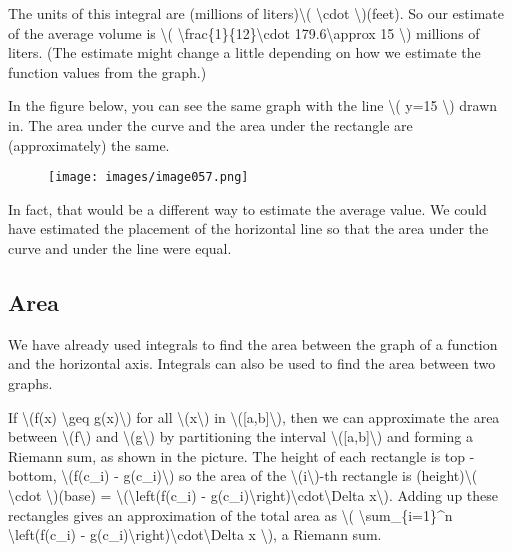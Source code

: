 The units of this integral are (millions of liters)\textbackslash{}(
\textbackslash{}cdot \textbackslash{})(feet). So our estimate of the
average volume is \textbackslash{}(
\textbackslash{}frac\{1\}\{12\}\textbackslash{}cdot
179.6\textbackslash{}approx 15 \textbackslash{}) millions of liters.
(The estimate might change a little depending on how we estimate the
function values from the graph.)

In the figure below, you can see the same graph with the line
\textbackslash{}( y=15 \textbackslash{}) drawn in. The area under the
curve and the area under the rectangle are (approximately) the same.

\begin{figure}
\centering
\texttt{[image: images/image057.png]}
\caption{}
\end{figure}

In fact, that would be a different way to estimate the average value. We
could have estimated the placement of the horizontal line so that the
area under the curve and under the line were equal.

\hypertarget{area}{%
\subsection{Area}\label{area}}

We have already used integrals to find the area between the graph of a
function and the horizontal axis. Integrals can also be used to find the
area between two graphs.

If \textbackslash{}(f(x) \textbackslash{}geq g(x)\textbackslash{}) for
all \textbackslash{}(x\textbackslash{}) in
\textbackslash{}({[}a,b{]}\textbackslash{}), then we can approximate the
area between \textbackslash{}(f\textbackslash{}) and
\textbackslash{}(g\textbackslash{}) by partitioning the interval
\textbackslash{}({[}a,b{]}\textbackslash{}) and forming a Riemann sum,
as shown in the picture. The height of each rectangle is top - bottom,
\textbackslash{}(f(c\_i) - g(c\_i)\textbackslash{}) so the area of the
\textbackslash{}(i\textbackslash{})-th rectangle is
(height)\textbackslash{}( \textbackslash{}cdot \textbackslash{})(base) =
\textbackslash{}(\textbackslash{}left(f(c\_i) -
g(c\_i)\textbackslash{}right)\textbackslash{}cdot\textbackslash{}Delta
x\textbackslash{}). Adding up these rectangles gives an approximation of
the total area as \textbackslash{}( \textbackslash{}sum\_\{i=1\}\^{}n
\textbackslash{}left(f(c\_i) -
g(c\_i)\textbackslash{}right)\textbackslash{}cdot\textbackslash{}Delta x
\textbackslash{}), a Riemann sum.

